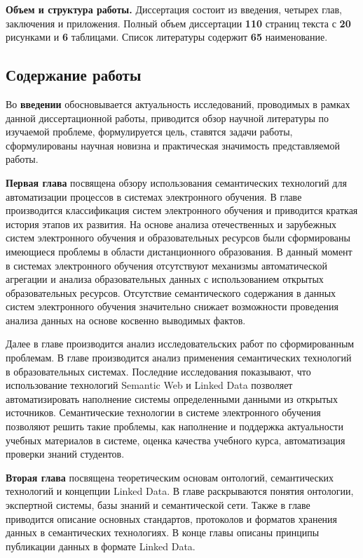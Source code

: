 \textbf{Объем и структура работы.} Диссертация состоит из введения, четырех глав, заключения и приложения. Полный объем диссертации \textbf{110} страниц текста с \textbf{20} рисунками и \textbf{6} таблицами. Список литературы содержит \textbf{65} наименование.

\subsection*{\Large Содержание работы}
Во \textbf{введении} обосновывается актуальность исследований, проводимых в рамках данной диссертационной работы, приводится обзор научной литературы по изучаемой проблеме, формулируется цель, ставятся задачи работы, сформулированы научная новизна и практическая значимость представляемой работы.

\textbf{Первая глава} посвящена обзору использования семантических технологий для автоматизации процессов в системах электронного обучения. В главе производится классификация систем электронного обучения и приводится краткая история этапов их развития. На основе анализа отечественных и зарубежных систем электронного обучения и образовательных ресурсов были сформированы имеющиеся проблемы в области дистанционного образования. В данный момент в системах электронного обучения отсутствуют механизмы автоматической агрегации и анализа образовательных данных с использованием открытых образовательных ресурсов. Отсутствие семантического содержания в данных систем электронного обучения значительно снижает возможности проведения анализа данных на основе косвенно выводимых фактов.

Далее в главе производится анализ исследовательских работ по сформированным проблемам. В главе производится анализ применения семантических технологий в образовательных системах. Последние исследования показывают, что использование технологий Semantic Web и Linked Data позволяет автоматизировать наполнение системы определенными данными из открытых источников. Семантические технологии в системе электронного обучения позволяют решить такие проблемы, как наполнение и поддержка актуальности учебных материалов в системе, оценка качества учебного курса, автоматизация проверки знаний студентов.  

\textbf{Вторая глава} посвящена теоретическим основам онтологий, семантических технологий и концепции Linked Data. В главе раскрываются понятия онтологии, экспертной системы, базы знаний и семантической сети. Также в главе приводится описание основных стандартов, протоколов и форматов хранения данных в семантических технологиях. В конце главы описаны принципы публикации данных в формате Linked Data.


